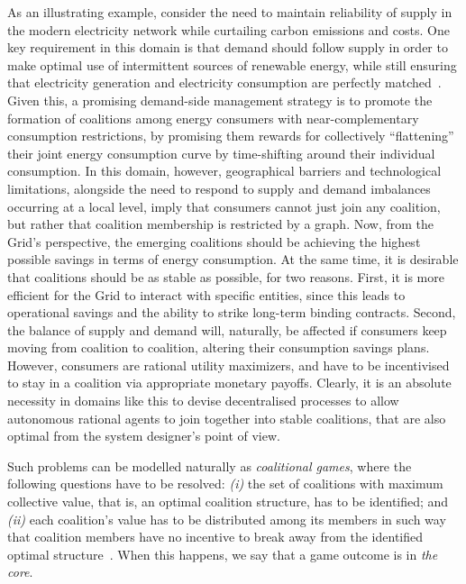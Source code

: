 \documentclass{aamas2012}
\begin{document}
As an illustrating example, consider the need to maintain reliability of supply in the modern electricity network
while curtailing carbon emissions and costs. One key requirement in this domain
is that demand should follow supply in
order to make optimal use of intermittent sources of renewable energy, while still ensuring
that electricity generation and electricity consumption are perfectly matched~\cite{GridVision}. 
Given this, a promising demand-side management strategy is to promote the formation of coalitions among
energy consumers with near-complementary consumption restrictions, by promising them rewards for collectively ``flattening'' their joint energy
consumption curve by time-shifting around their individual consumption.
In this domain, however, geographical barriers and technological limitations,
alongside the need to respond to supply and demand imbalances occurring at a local level, imply that consumers cannot just join any coalition, but rather that  coalition membership is restricted by a graph.
Now, from the Grid's perspective, the emerging coalitions should be achieving the highest possible savings in terms of energy consumption. 
At the same time, it is desirable that coalitions should be as stable as possible, for two reasons. 
First, it is more efficient for the Grid to interact with specific entities, since this leads to operational savings and the ability to 
strike long-term binding contracts.
Second, the balance of supply and demand will, naturally, be affected if consumers keep moving from coalition to coalition, altering their consumption savings plans. 
However, consumers are rational utility maximizers, and have to be incentivised to stay in a coalition via appropriate monetary payoffs.
Clearly, it is an absolute necessity in domains like this to devise decentralised processes
to allow autonomous rational agents to join together into stable coalitions, that are also optimal from
the system designer's point of view.

 Such problems can be modelled naturally as {\em coalitional games}, where
 the following questions have to be resolved: {\em (i)} the set of coalitions with maximum collective value, that is, an optimal
 coalition structure, has to be identified; 
 and {\em (ii)} each coalition's value has to be distributed 
among its members in such way that coalition members have no incentive to break away from the identified optimal structure~\cite{osborne}.
When this happens, we say that a game outcome is in {\em the core}.
\end{document}
